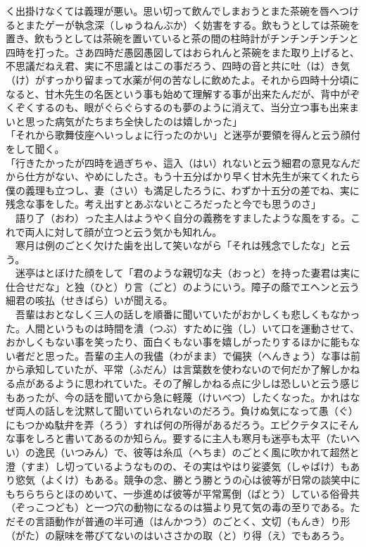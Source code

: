 く出掛けなくては義理が悪い。思い切って飲んでしまおうとまた茶碗を唇へつけるとまたゲーが執念深（しゅうねんぶか）く妨害をする。飲もうとしては茶碗を置き、飲もうとしては茶碗を置いていると茶の間の柱時計がチンチンチンチンと四時を打った。さあ四時だ愚図愚図してはおられんと茶碗をまた取り上げると、不思議だねえ君、実に不思議とはこの事だろう、四時の音と共に吐（は）き気（け）がすっかり留まって水薬が何の苦なしに飲めたよ。それから四時十分頃になると、甘木先生の名医という事も始めて理解する事が出来たんだが、背中がぞくぞくするのも、眼がぐらぐらするのも夢のように消えて、当分立つ事も出来まいと思った病気がたちまち全快したのは嬉しかった」\\
「それから歌舞伎座へいっしょに行ったのかい」と迷亭が要領を得んと云う顔付をして聞く。\\
「行きたかったが四時を過ぎちゃ、這入（はい）れないと云う細君の意見なんだから仕方がない、やめにしたさ。もう十五分ばかり早く甘木先生が来てくれたら僕の義理も立つし、妻（さい）も満足したろうに、わずか十五分の差でね、実に残念な事をした。考え出すとあぶないところだったと今でも思うのさ」\\
　語り了（おわ）った主人はようやく自分の義務をすましたような風をする。これで両人に対して顔が立つと云う気かも知れん。\\
　寒月は例のごとく欠けた歯を出して笑いながら「それは残念でしたな」と云う。\\
　迷亭はとぼけた顔をして「君のような親切な夫（おっと）を持った妻君は実に仕合せだな」と独（ひと）り言（ごと）のようにいう。障子の蔭でエヘンと云う細君の咳払（せきばら）いが聞える。\\
　吾輩はおとなしく三人の話しを順番に聞いていたがおかしくも悲しくもなかった。人間というものは時間を潰（つぶ）すために強（し）いて口を運動させて、おかしくもない事を笑ったり、面白くもない事を嬉しがったりするほかに能もない者だと思った。吾輩の主人の我儘（わがまま）で偏狭（へんきょう）な事は前から承知していたが、平常（ふだん）は言葉数を使わないので何だか了解しかねる点があるように思われていた。その了解しかねる点に少しは恐しいと云う感じもあったが、今の話を聞いてから急に軽蔑（けいべつ）したくなった。かれはなぜ両人の話しを沈黙して聞いていられないのだろう。負けぬ気になって愚（ぐ）にもつかぬ駄弁を弄（ろう）すれば何の所得があるだろう。エピクテタスにそんな事をしろと書いてあるのか知らん。要するに主人も寒月も迷亭も太平（たいへい）の逸民（いつみん）で、彼等は糸瓜（へちま）のごとく風に吹かれて超然と澄（すま）し切っているようなものの、その実はやはり娑婆気（しゃばけ）もあり慾気（よくけ）もある。競争の念、勝とう勝とうの心は彼等が日常の談笑中にもちらちらとほのめいて、一歩進めば彼等が平常罵倒（ばとう）している俗骨共（ぞっこつども）と一つ穴の動物になるのは猫より見て気の毒の至りである。ただその言語動作が普通の半可通（はんかつう）のごとく、文切（もんき）り形（がた）の厭味を帯びてないのはいささかの取（と）り得（え）でもあろう。\\
